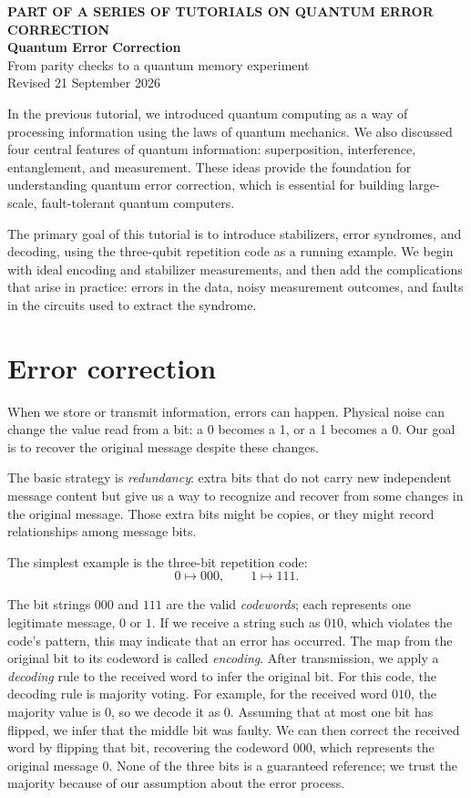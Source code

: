 \documentclass[11pt,a4paper]{article}
\begin{document}
\begin{center}
{\small\color{teal}\textbf{PART OF A SERIES OF TUTORIALS ON QUANTUM ERROR CORRECTION}}\\[9pt]
{\LARGE\bfseries\color{ink} Quantum Error Correction}\\[10pt]
{\large From parity checks to a quantum memory experiment}\\[9pt]
{\small Revised 21 September 2026}
\end{center}
\vspace{3pt}
In the previous tutorial, we introduced quantum computing as a way of processing information using the laws of quantum mechanics. We also discussed four central features of quantum information: superposition, interference, entanglement, and measurement. These ideas provide the foundation for understanding quantum error correction, which is essential for building large-scale, fault-tolerant quantum computers.

The primary goal of this tutorial is to introduce stabilizers, error syndromes, and decoding, using the three-qubit repetition code as a running example. We begin with ideal encoding and stabilizer measurements, and then add the complications that arise in practice: errors in the data, noisy measurement outcomes, and faults in the circuits used to extract the syndrome.

\section{Error correction}
When we store or transmit information, errors can happen. Physical noise can change the value read from a bit: a 0 becomes a 1, or a 1 becomes a 0. Our goal is to recover the original message despite these changes.

The basic strategy is \emph{redundancy}: extra bits that do not carry new independent message content but give us a way to recognize and recover from some changes in the original message. Those extra bits might be copies, or they might record relationships among message bits. 

The simplest example is the three-bit repetition code:
\begin{equation}\label{eq:classical-code}
0\longmapsto 000,\qquad 1\longmapsto 111.
\end{equation}

The bit strings \(000\) and \(111\) are the valid \emph{codewords}; each represents one legitimate message, \(0\) or \(1\). If we receive a string such as \(010\), which violates the code's pattern, this may indicate that an error has occurred.
The map from the original bit to its codeword is called \emph{encoding}. After transmission, we apply a \emph{decoding} rule to the received word to infer the original bit. For this code, the decoding rule is majority voting. For example, for the received word \(010\), the majority value is \(0\), so we decode it as \(0\). Assuming that at most one bit has flipped, we infer that the middle bit was faulty. We can then correct the received word by flipping that bit, recovering the codeword \(000\), which represents the original message \(0\).
None of the three bits is a guaranteed reference; we trust the majority because of our assumption about the error process.
\end{document}
